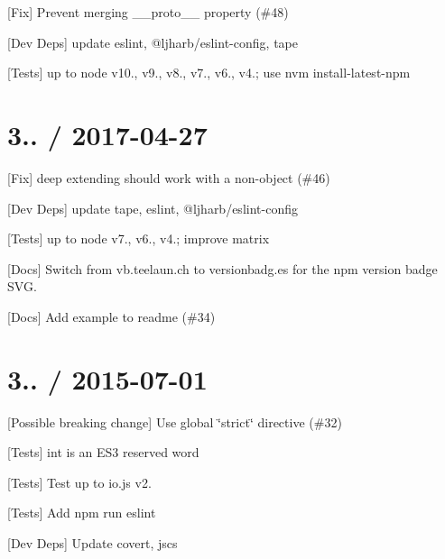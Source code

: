 
\begin{DoxyItemize}
\item \mbox{[}Fix\mbox{]} Prevent merging {\ttfamily \+\_\+\+\_\+proto\+\_\+\+\_\+} property (\#48)
\item \mbox{[}Dev Deps\mbox{]} update {\ttfamily eslint}, {\ttfamily @ljharb/eslint-\/config}, {\ttfamily tape}
\item \mbox{[}Tests\mbox{]} up to {\ttfamily node} {\ttfamily v10.}, {\ttfamily v9.}, {\ttfamily v8.}, {\ttfamily v7.}, {\ttfamily v6.}, {\ttfamily v4.}; use {\ttfamily nvm install-\/latest-\/npm}
\end{DoxyItemize}

\section*{3.. / 2017-\/04-\/27 }


\begin{DoxyItemize}
\item \mbox{[}Fix\mbox{]} deep extending should work with a non-\/object (\#46)
\item \mbox{[}Dev Deps\mbox{]} update {\ttfamily tape}, {\ttfamily eslint}, {\ttfamily @ljharb/eslint-\/config}
\item \mbox{[}Tests\mbox{]} up to {\ttfamily node} {\ttfamily v7.}, {\ttfamily v6.}, {\ttfamily v4.}; improve matrix
\item \mbox{[}Docs\mbox{]} Switch from vb.\+teelaun.\+ch to versionbadg.\+es for the npm version badge S\+VG.
\item \mbox{[}Docs\mbox{]} Add example to readme (\#34)
\end{DoxyItemize}

\section*{3.. / 2015-\/07-\/01 }


\begin{DoxyItemize}
\item \mbox{[}Possible breaking change\mbox{]} Use global \char`\"{}strict\char`\"{} directive (\#32)
\item \mbox{[}Tests\mbox{]} {\ttfamily int} is an E\+S3 reserved word
\item \mbox{[}Tests\mbox{]} Test up to {\ttfamily io.\+js} {\ttfamily v2.}
\item \mbox{[}Tests\mbox{]} Add {\ttfamily npm run eslint}
\item \mbox{[}Dev Deps\mbox{]} Update {\ttfamily covert}, {\ttfamily jscs}
\end{DoxyItemize}

